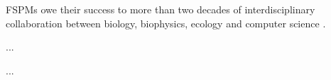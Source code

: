 
FSPMs owe their success to more than two decades of interdisciplinary collaboration between biology, biophysics, ecology and computer science \supercite{louarn_two_2020}.



...


...




